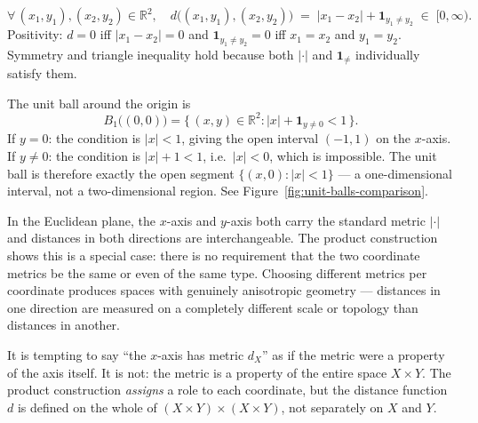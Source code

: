 \begin{remark*}
\[
\forall\,(x_1,y_1),(x_2,y_2) \in \mathbb{R}^2, \quad
d\bigl((x_1,y_1),(x_2,y_2)\bigr)
\;=\; |x_1 - x_2| + \mathbf{1}_{y_1 \neq y_2} \;\in\; [0,\infty).
\]
Positivity: $d = 0$ iff $|x_1-x_2| = 0$ and $\mathbf{1}_{y_1\neq y_2} = 0$
iff $x_1 = x_2$ and $y_1 = y_2$. Symmetry and triangle inequality hold
because both $|\cdot|$ and $\mathbf{1}_{\neq}$ individually satisfy them.
\end{remark*}

\begin{remark*}
The unit ball around the origin is
\[
B_1\bigl((0,0)\bigr)
= \bigl\{\,(x,y) \in \mathbb{R}^2 :
|x| + \mathbf{1}_{y \neq 0} < 1\,\bigr\}.
\]
If $y = 0$: the condition is $|x| < 1$, giving the open interval $(-1,1)$
on the $x$-axis.
If $y \neq 0$: the condition is $|x| + 1 < 1$, i.e.\ $|x| < 0$, which is
impossible.
The unit ball is therefore exactly the open segment
$\{(x,0) : |x| < 1\}$ --- a one-dimensional interval, not a
two-dimensional region.
See Figure~\ref{fig:unit-balls-comparison}.
\end{remark*}

\begin{remark*}
In the Euclidean plane, the $x$-axis and $y$-axis both carry the standard
metric $|{\cdot}|$ and distances in both directions are interchangeable.
The product construction shows this is a special case: there is no
requirement that the two coordinate metrics be the same or even of the
same type.
Choosing different metrics per coordinate produces spaces with genuinely
anisotropic geometry --- distances in one direction are measured on a
completely different scale or topology than distances in another.
\end{remark*}

\begin{remark*}
It is tempting to say ``the $x$-axis has metric $d_X$'' as if the metric
were a property of the axis itself.
It is not: the metric is a property of the entire space $X \times Y$.
The product construction \emph{assigns} a role to each coordinate, but
the distance function $d$ is defined on the whole of
$(X \times Y) \times (X \times Y)$, not separately on $X$ and $Y$.
\end{remark*}


